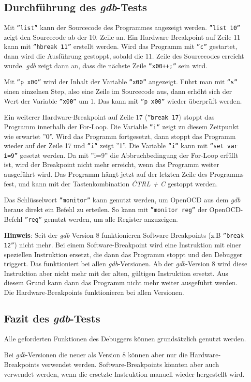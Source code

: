 \subsection{Durchführung des \textit{gdb}-Tests}
Mit \texttt{''list''} kann der Sourcecode des Programmes angezeigt werden.
\texttt{''list 10''} zeigt den Sourcecode ab der 10. Zeile an.
Ein Hardware-Breakpoint auf Zeile 11 kann mit \texttt{''hbreak 11''} erstellt werden.
Wird das Programm mit \texttt{''c''} gestartet, dann wird die Ausführung gestoppt, sobald die 11. Zeile des Sourcecodes erreicht wurde.
\textit{gdb} zeigt dann an, dass die nächste Zeile \texttt{''x00++;''} sein wird.

Mit \texttt{''p x00''} wird der Inhalt der Variable \texttt{''x00''} angezeigt.
Führt man mit \texttt{''s''} einen einzelnen Step, also eine Zeile im Sourcecode aus, dann erhöht sich der Wert der Variable \texttt{''x00''} um 1.
Das kann mit \texttt{''p x00''}  wieder überprüft werden.


Ein weiterer Hardware-Breakpoint auf Zeile 17 (\texttt{''break 17}) stoppt das Programm innerhalb der For-Loop.
Die Variable \texttt{''i''} zeigt zu diesem Zeitpunkt wie erwartet ''0''.
Wird das Programm fortgesetzt, dann stoppt das Programm wieder auf der Zeile 17 und \texttt{''i''} zeigt ''1''.
Die Variable \texttt{''i''} kann mit \texttt{''set var i=9''} gesetzt werden.
Da mit ''i=9'' die Abbruchbedingung der For-Loop erfüllt ist, wird der Breakpoint nicht mehr erreicht, wenn das Programm weiter ausgeführt wird.
Das Programm hängt jetzt auf der letzten Zeile des Programms fest, und kann mit der Tastenkombination \textit{ĈTRL + C} gestoppt werden.

Das Schlüsselwort \texttt{''monitor''} kann genutzt werden, um OpenOCD aus dem \textit{gdb} heraus direkt ein Befehl zu erteilen.
So kann mit \texttt{''monitor reg''} der OpenOCD-Befehl \texttt{''reg''} genutzt werden, um alle Register anzuzeigen.

\textbf{Hinweis}: 
Seit der \textit{gdb}-Version 8 funktionieren Software-Breakpoints (z.B \texttt{''break 12''}) nicht mehr.
Bei einem Software-Breakpoint wird eine Instruktion mit einer speziellen Instruktion ersetzt, die dann das Programm stoppt und den Debugger triggert.
Das funktioniert bei allen \textit{gdb}-Versionen.
Ab der \textit{gdb}-Version 8 wird diese Instruktion aber nicht mehr mit der alten, gültigen Instruktion ersetzt.
Aus diesem Grund kann dann das Programm nicht mehr weiter ausgeführt werden.
Die Hardware-Breakpoints funktionieren bei allen Versionen.


\subsection{Fazit des \textit{gdb}-Tests}
Alle geforderten Funktionen des Debuggers können grundsätzlich genutzt werden.

Bei \textit{gdb}-Versionen die neuer als Version 8 können aber nur die Hardware-Breakpoints verwendet werden.
Software-Breakpoints könnten aber auch verwendet werden, wenn die ersetzte Instruktion manuell wieder hergestellt wird.



